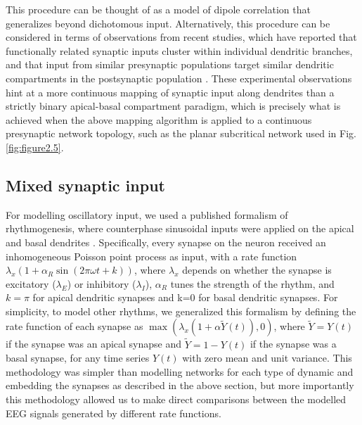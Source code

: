 This procedure can be thought of as a model of dipole correlation that generalizes beyond dichotomous input. Alternatively, this procedure can be considered in terms of observations from recent studies, which have reported that functionally related synaptic inputs cluster within individual dendritic branches, and that input from similar presynaptic populations target similar dendritic compartments in the postsynaptic population \cite{Iacaruso2017, Ju2020, Kerlin2019, Lafourcade2022, Scholl2017}. These experimental observations hint at a more continuous mapping of synaptic input along dendrites than a strictly binary apical-basal compartment paradigm, which is precisely what is achieved when the above mapping algorithm is applied to a continuous presynaptic network topology, such as the planar subcritical network used in Fig. \ref{fig:figure2.5}.

\subsection{Mixed synaptic input}
For modelling oscillatory input, we used a published formalism of rhythmogenesis, where counterphase sinusoidal inputs were applied on the apical and basal dendrites \cite{Jones2009, Studenova2022}. Specifically, every synapse on the neuron received an inhomogeneous Poisson point process as input, with a rate function $\lambda_x\left(1+\alpha_R\sin{\left(2\pi\omega t+k\right)}\right)$, where $\lambda_x$ depends on whether the synapse is excitatory ($\lambda_E$) or inhibitory ($\lambda_I$), $\alpha_R$ tunes the strength of the rhythm, and $k=\pi$ for apical dendritic synapses and k=0 for basal dendritic synapses. For simplicity, to model other rhythms, we generalized this formalism by defining the rate function of each synapse as $\max{\left(\lambda_x\left(1+\alpha\widetilde{Y}{\left(t\right)}\right),0\right)}$, where $\widetilde{Y}=Y(t)$ if the synapse was an apical synapse and $\widetilde{Y}=1-Y(t)$ if the synapse was a basal synapse, for any time series $Y(t)$ with zero mean and unit variance. This methodology was simpler than modelling networks for each type of dynamic and embedding the synapses as described in the above section, but more importantly this methodology allowed us to make direct comparisons between the modelled EEG signals generated by different rate functions.

